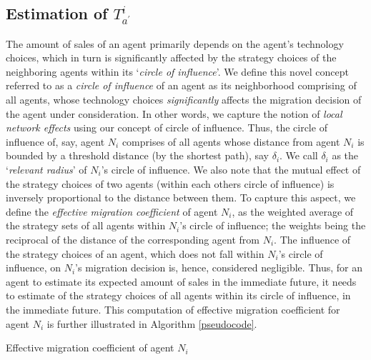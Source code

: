 \documentclass[smallextended]{svjour3}
\begin{document}
\subsection{Estimation of $T_{a^\prime}^i$} \label{sec:estimation approaches}
The amount of sales of an agent primarily depends on the agent's technology
choices, which in turn is significantly affected by the strategy choices of the
neighboring agents within its `\emph{circle of influence}'. We define this
novel concept referred to as a \emph{circle of influence} of an agent as its
neighborhood comprising of all agents, whose technology choices
\emph{significantly} affects the migration decision of the agent under
consideration. In other words, we capture the notion of \emph{local network
effects} \cite{localNetworkEffects} using our concept of circle of influence.
Thus, the circle of influence of, say, agent $N_i$ comprises of all agents whose
distance from agent $N_i$ is bounded by a threshold distance (by the shortest
path), say $\delta_i$.
We call $\delta_i$ as the `\emph{relevant radius}' of $N_i$'s circle of
influence. We also note that the mutual effect of the strategy choices of two
agents (within each others circle of influence) is inversely proportional to the
distance between them. To capture this aspect, we define the \emph{effective
migration coefficient} of agent $N_i$, as the weighted average of the strategy
sets of all agents within $N_i$'s circle of influence; the weights being the
reciprocal of the distance of the corresponding agent from $N_i$.
The influence of the strategy choices of an agent, which does not fall within
$N_i$'s circle of influence, on $N_i$'s migration decision is, hence, considered
negligible. Thus, for an agent to estimate its expected amount of sales in the
immediate future, it needs to estimate of the strategy choices of all agents
within its circle of influence, in the immediate future. This computation of
effective migration coefficient for agent $N_i$ is further illustrated in Algorithm \ref{pseudocode}.

\begin{algorithm}
\caption{Effective migration coefficient of agent $N_i$}
\label{pseudocode}
\begin{algorithmic}
		\ENDIF
	\ENDIF
\ENDFOR
{}
\end{algorithmic}
\end{algorithm}
\end{document}
